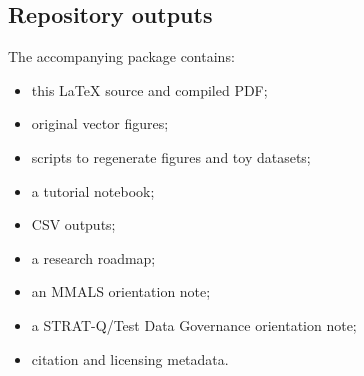 \subsection{Repository outputs}

The accompanying package contains:

\begin{itemize}[leftmargin=*]
  \item this LaTeX source and compiled PDF;
  \item original vector figures;
  \item scripts to regenerate figures and toy datasets;
  \item a tutorial notebook;
  \item CSV outputs;
  \item a research roadmap;
  \item an MMALS orientation note;
  \item a STRAT-Q/Test Data Governance orientation note;
  \item citation and licensing metadata.
\end{itemize}
